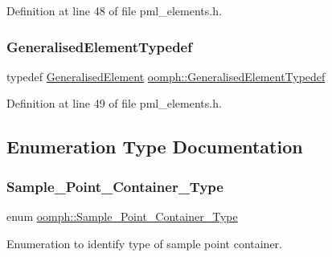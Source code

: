 Definition at line 48 of file pml\+\_\+elements.\+h.

\mbox{\label{namespaceoomph_a14fee011765f6f5c9d1923650cf4018e}} 
\subsubsection{\texorpdfstring{Generalised\+Element\+Typedef}{GeneralisedElementTypedef}}
{\footnotesize\ttfamily typedef \hyperlink{classoomph_1_1GeneralisedElement}{Generalised\+Element} \hyperlink{namespaceoomph_a14fee011765f6f5c9d1923650cf4018e}{oomph\+::\+Generalised\+Element\+Typedef}}



Definition at line 49 of file pml\+\_\+elements.\+h.



\subsection{Enumeration Type Documentation}
\mbox{\label{namespaceoomph_a8c0fdc9bd9751811cd49fe6f06c55991}} 
\subsubsection{\texorpdfstring{Sample\+\_\+\+Point\+\_\+\+Container\+\_\+\+Type}{Sample\_Point\_Container\_Type}}
{\footnotesize\ttfamily enum \hyperlink{namespaceoomph_a8c0fdc9bd9751811cd49fe6f06c55991}{oomph\+::\+Sample\+\_\+\+Point\+\_\+\+Container\+\_\+\+Type}}



Enumeration to identify type of sample point container. 

